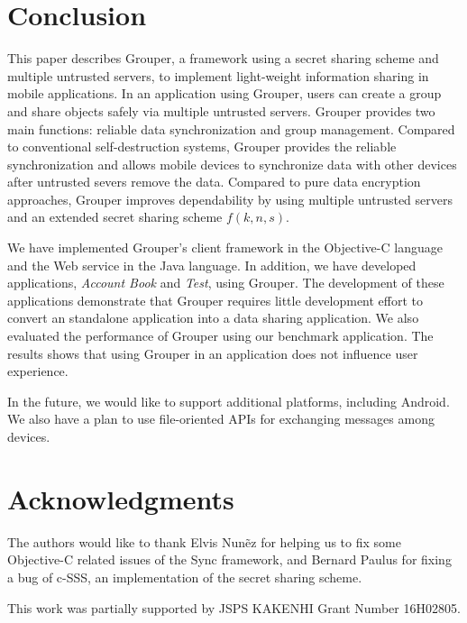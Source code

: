 \documentclass{sig-alternate-05-2015}
\begin{document}
\section{Conclusion}

This paper describes Grouper, a framework using a secret sharing scheme and multiple untrusted servers, to implement light-weight information sharing in mobile applications.
In an application using Grouper, users can create a group and share objects safely via multiple untrusted servers.
Grouper provides two main functions: reliable data synchronization and group management.
Compared to conventional self-destruction systems, Grouper provides the reliable synchronization and allows mobile devices to synchronize data with other devices after untrusted severs remove the data.
Compared to pure data encryption approaches, Grouper improves dependability by using multiple untrusted servers and an extended secret sharing scheme $f(k, n, s)$.

We have implemented Grouper's client framework in the Objective-C language and the Web service in the Java language. 
In addition, we have developed applications, \emph{Account Book} and \emph{Test}, using Grouper.
The development of these applications demonstrate that Grouper requires little development effort to convert an standalone application into a data sharing application.
We also evaluated the performance of Grouper using our benchmark application.
The results shows that using Grouper in an application does not influence user experience.

In the future, we would like to support additional platforms, including Android.
We also have a plan to use file-oriented APIs for exchanging messages among devices.

\section{Acknowledgments}

The authors would like to thank Elvis Nun{\~e}z for helping us to fix some Objective-C related issues of the Sync framework, and Bernard Paulus for fixing a bug of c-SSS, an implementation of the secret sharing scheme.

This work was partially supported by JSPS KAKENHI Grant Number 16H02805.


 
\end{document}
